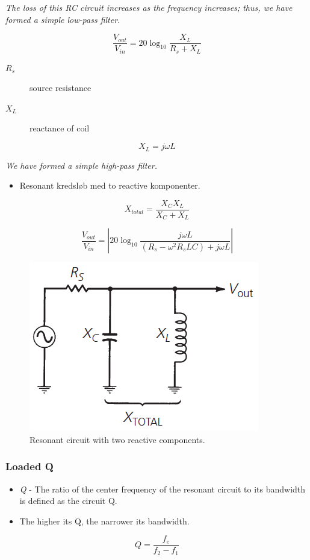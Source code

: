 \noindent\textit{The loss of this RC circuit	increases as the frequency increases; thus, we have formed a simple low-pass filter.}

\begin{equation}
\dfrac{V_{out}}{V_{in}} = 20\log_{10}\dfrac{X_L}{R_s+X_L}
\end{equation}

\begin{description}
	\item[$R_s$] source resistance
	\item[$X_L$] reactance of coil
\end{description}

\begin{equation}
X_L=j\omega L
\end{equation}

\noindent\textit{We have formed a simple high-pass filter.}

\begin{itemize}
	\item Resonant kredsløb med to reactive komponenter.
\end{itemize}
\begin{equation}
X_{total}=\dfrac{X_C X_L}{X_C + X_L}
\end{equation}

\begin{equation}
\dfrac{V_{out}}{V_{in}} = \left|20\log_{10}\dfrac{j\omega L}{(R_s-\omega^2 R_s L C)+j\omega L}\right|
\end{equation}

\begin{figure} [H]
	\centering
	\includegraphics[width=0.5\linewidth]{graphics/22.png}
	\caption{Resonant circuit with two reactive components.}
	\label{fig:22}
\end{figure}

\subsubsection{Loaded Q}
\begin{itemize}
	\item \textit{Q} - The ratio of the center frequency of the resonant
	circuit to its bandwidth is defined as the circuit Q.
	\item The higher its Q, the narrower its bandwidth.
\end{itemize}
\begin{equation}
Q = \dfrac{f_e}{f_2-f_1}
\end{equation}

